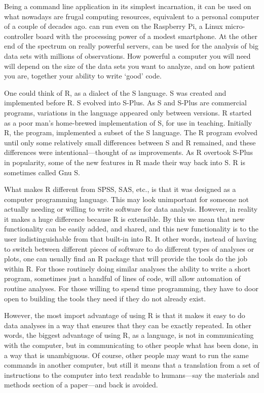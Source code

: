 \documentclass[krantz2,ChapterTOCs]{krantz}\usepackage{knitr}
\begin{document}
Being \Rpgrm a command line application in its simplest incarnation, it can be used on what nowadays are frugal computing resources, equivalent to a personal computer of a couple of decades ago. \Rpgrm can run even on the Raspberry Pi, a Linux micro-controller board with the processing power of a modest smartphone. At the other end of the spectrum on really powerful servers,  can be used for the analysis of big data sets with millions of observations. How powerful a computer you will need will depend on the size of the data sets you want to analyze, and on how patient you are, together your ability to write `good' code.

One could think of R, as a dialect of the S language. S was created and implemented before R. S evolved into S-Plus. As S and S-Plus are commercial programs, variations in the language appeared only between versions. R started as a poor man's home-brewed implementation of S, for use in teaching. Initially R, the program, implemented a subset of the S language. The R program evolved until only some relatively small differences between S and R remained, and these differences were intentional---thought of as improvements. As R overtook S-Plus in popularity, some of the new features in R made their way back into S. R is sometimes called Gnu S.

What makes R different from SPSS, SAS, etc., is that it was designed as a computer programming language. This may look unimportant for someone not actually needing or willing to write software for data analysis. However, in reality it makes a huge difference because R is extensible. By this we mean that new functionality can be easily added, and shared, and this new functionality is to the user indistinguishable from that built-in into R. It other words, instead of having to switch between different pieces of software to do different types of analyses or plots, one can usually find an R package that will provide the tools do the job within R. For those routinely doing similar analyses the ability to write a short program, sometimes just a handful of lines of code, will allow automation of routine analyses. For those willing to spend time programming, they have to door open to building the tools they need if they do not already exist.

However, the most import advantage of using R is that it makes it easy to do data analyses in a way that ensures that they can be exactly repeated. In other words, the biggest advantage of using R, as a language, is not in communicating with the computer, but in communicating to other people what has been done, in a way that is unambiguous. Of course, other people may want to run the same commands in another computer, but still it means that a translation from a set of instructions to the computer into text readable to humans---say the materials and methods section of a paper---and back is avoided.
\end{document}
